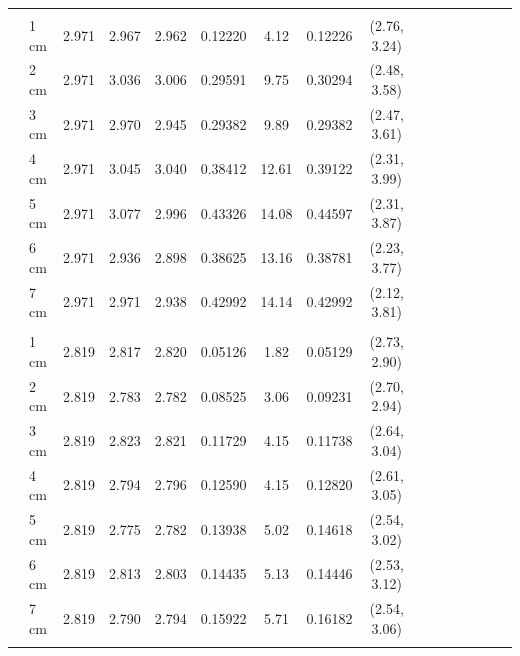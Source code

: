 \documentclass[a4paper 12pt]{article}
\numberwithin{equation}{section}
\begin{document}
\begin{small}
\begin{table}[h!]
\begin{footnotesize}
\begin{tabular}{clclclclclclclcl}
 \raisebox{1ex}{age 5}  \\ [1.0ex]
&  1 cm  & 2.971 &     2.967   & 2.962 & 0.12220& 4.12  & 0.12226 & (2.76, 3.24) \\
&   2 cm & 2.971 &     3.036   & 3.006 & 0.29591& 9.75  & 0.30294 & (2.48, 3.58) \\
&   3 cm & 2.971 &     2.970   & 2.945 & 0.29382& 9.89  & 0.29382 & (2.47, 3.61) \\
&   4 cm & 2.971 &     3.045   & 3.040 & 0.38412& 12.61 & 0.39122 & (2.31, 3.99) \\
&   5 cm & 2.971 &     3.077   & 2.996 & 0.43326& 14.08 & 0.44597 & (2.31, 3.87)\\
&   6 cm & 2.971 &     2.936   & 2.898 & 0.38625& 13.16 & 0.38781 & (2.23, 3.77)\\
&   7 cm & 2.971 &     2.971   & 2.938 & 0.42992& 14.14 & 0.42992 & (2.12, 3.81)\\[1.2ex]

 \raisebox{1ex}{\bf age 6+} &   \\ [1.0ex]
&   1 cm & 2.819  &   2.817 & 2.820 & 0.05126& 1.82 & 0.05129 & (2.73, 2.90) \\
&   2 cm & 2.819  &   2.783 & 2.782 & 0.08525& 3.06 & 0.09231 & (2.70, 2.94) \\
&   3 cm & 2.819  &   2.823 & 2.821 & 0.11729& 4.15 & 0.11738 & (2.64, 3.04) \\
&   4 cm & 2.819  &   2.794 & 2.796 & 0.12590& 4.15 & 0.12820 & (2.61, 3.05) \\
&   5 cm & 2.819  &   2.775 & 2.782 & 0.13938& 5.02 & 0.14618 & (2.54, 3.02) \\
&   6 cm & 2.819  &   2.813 & 2.803 & 0.14435& 5.13 & 0.14446 & (2.53, 3.12)  \\
&   7 cm & 2.819  &   2.790 & 2.794 & 0.15922& 5.71 & 0.16182 & (2.54, 3.06)  \\[0.1ex]
   \hline \\
\end{tabular}
\end{footnotesize}
\end{table}
 \end{small}
 
\end{document}
